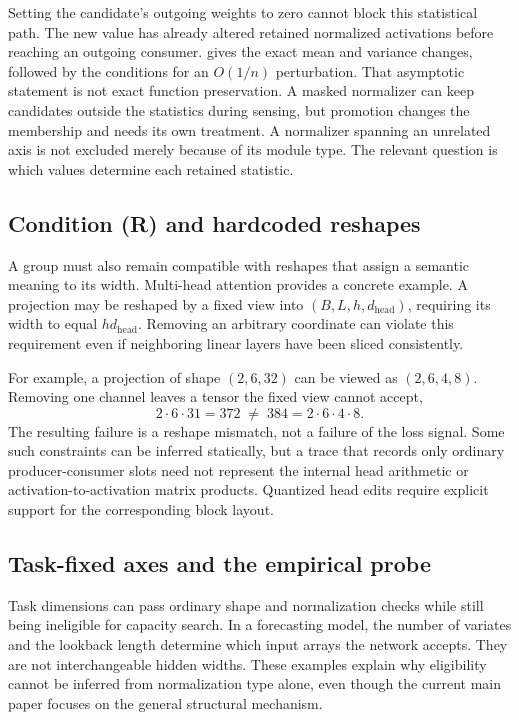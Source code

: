 \documentclass[10pt]{article}
\theoremstyle{paper}
\begin{document}
Setting the candidate's outgoing weights to zero cannot block this statistical path. The new value has already altered retained normalized activations before reaching an outgoing consumer.  gives the exact mean and variance changes, followed by the conditions for an $O(1/n)$ perturbation. That asymptotic statement is not exact function preservation. A masked normalizer can keep candidates outside the statistics during sensing, but promotion changes the membership and needs its own treatment. A normalizer spanning an unrelated axis is not excluded merely because of its module type. The relevant question is which values determine each retained statistic.

\subsection{Condition (R) and hardcoded reshapes}
\label{app:reshapes}
A group must also remain compatible with reshapes that assign a semantic meaning to its width. Multi-head attention \citep{vaswani2017attention} provides a concrete example. A projection may be reshaped by a fixed view into $(B,L,h,d_{\mathrm{head}})$, requiring its width to equal $h d_{\mathrm{head}}$. Removing an arbitrary coordinate can violate this requirement even if neighboring linear layers have been sliced consistently.

For example, a projection of shape $(2,6,32)$ can be viewed as $(2,6,4,8)$. Removing one channel leaves a tensor the fixed view cannot accept,
\begin{equation}
2\cdot6\cdot31=372\;\neq\;384=2\cdot6\cdot4\cdot8.
\label{eq:reshapemismatch}
\end{equation} The resulting failure is a reshape mismatch, not a failure of the loss signal. Some such constraints can be inferred statically, but a trace that records only ordinary producer-consumer slots need not represent the internal head arithmetic or activation-to-activation matrix products. Quantized head edits require explicit support for the corresponding block layout.

\subsection{Task-fixed axes and the empirical probe}
\label{app:task-axes}
Task dimensions can pass ordinary shape and normalization checks while still being ineligible for capacity search. In a forecasting model, the number of variates and the lookback length determine which input arrays the network accepts. They are not interchangeable hidden widths. These examples explain why eligibility cannot be inferred from normalization type alone, even though the current main paper focuses on the general structural mechanism.
\end{document}
